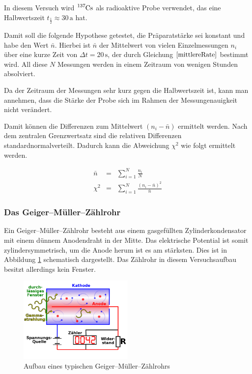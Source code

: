 \documentclass[12pt,a4paper]{scrartcl}
\numberwithin{equation}{section} %
\begin{document}
In diesem Versuch wird $\ce{^{137}Cs}$ als radioaktive Probe verwendet, das eine Halbwertszeit $t_\frac{1}{2}\approx 30\,\mathrm a$ hat.

Damit soll die folgende Hypothese getestet, die Präparatstärke sei konstant und habe den Wert $\bar n$. Hierbei ist $\bar n$ der Mittelwert von vielen Einzelmessungen $n_i$ über eine kurze Zeit von $\Delta t=20\,\mathrm s$, der durch Gleichung $\eqref{mittlereRate}$ bestimmt wird. All diese $N$ Messungen werden in einem Zeitraum von wenigen Stunden absolviert.

Da der Zeitraum der Messungen sehr kurz gegen die Halbwertszeit ist, kann man annehmen, dass die Stärke der Probe sich im Rahmen der Messungenauigkeit nicht verändert.

Damit können die Differenzen zum Mittelwert $(n_i-\bar n)$ ermittelt werden. Nach dem zentralen Grenzwertsatz sind die relativen Differenzen standardnormalverteilt. Dadurch kann die Abweichung $\chi^2$ wie folgt ermittelt werden.

\begin{eqnarray}
    \bar n &=& \sum_{i=1}^N \frac{n_i}{N} \label{mittlereRate} \\
    \chi^2 &=& \sum_{i=1}^N \frac{(n_i-\bar n)^2}{\bar n} \label{ChiSquared}
\end{eqnarray}

\subsubsection{Das Geiger--Müller--Zählrohr}
\label{Geiger--Müller--Zählrohr}
Ein Geiger--Müller--Zählrohr besteht aus einem gasgefüllten Zylinderkondensator mit einem dünnem Anodendraht in der Mitte. Das elektrische Potential ist somit zylindersymmetrisch, um die Anode herum ist es am stärksten. Dies ist in Abbildung \ref{fig:Geiger--Müller--Zählrohr} schematisch dargestellt. Das Zählrohr in diesem Versuchsaufbau besitzt allerdings kein Fenster.

\begin{figure}[h!]
	\centering
	\includegraphics[width=0.5\textwidth]{../media/B3.1/640px-Geiger_Mueller_Counter_with_Circuit-de.svg.png}
	\caption{Aufbau eines typischen Geiger--Müller--Zählrohrs \cite{File:Geigerzählrohr}}
	\label{fig:Geiger--Müller--Zählrohr}
\end{figure}
\end{document}
